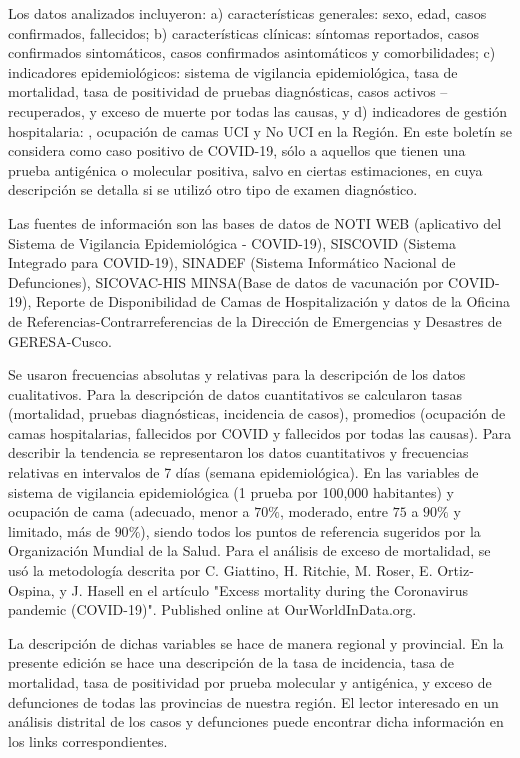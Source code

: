 \documentclass[12pt,a4paper,openany]{book}
\begin{document}
	Los datos analizados incluyeron: a) características generales: sexo, edad, casos confirmados, fallecidos; b) características clínicas: síntomas reportados, casos confirmados sintomáticos, casos confirmados asintomáticos y comorbilidades; c) indicadores epidemiológicos: sistema de vigilancia epidemiológica, tasa de mortalidad, tasa de positividad de pruebas diagnósticas, casos activos – recuperados, y exceso de muerte por todas las causas, y d) indicadores de gestión hospitalaria: , ocupación de camas UCI y No UCI en la Región. En este boletín se considera como caso positivo de COVID-19, sólo a aquellos que tienen una prueba antigénica o molecular positiva, salvo en ciertas estimaciones, en cuya descripción se detalla si se utilizó otro tipo de examen diagnóstico. 
	
	Las fuentes de información son las bases de datos de NOTI WEB (aplicativo del Sistema de Vigilancia Epidemiológica - COVID-19), SISCOVID (Sistema Integrado para COVID-19), SINADEF (Sistema Informático Nacional de Defunciones), SICOVAC-HIS MINSA(Base de datos de vacunación por COVID-19), Reporte de Disponibilidad de Camas de Hospitalización y datos de la Oficina de Referencias-Contrarreferencias de la Dirección de Emergencias y Desastres de GERESA-Cusco. 
	
	Se usaron frecuencias absolutas y relativas para la descripción de los datos cualitativos. Para la descripción de datos cuantitativos se calcularon tasas (mortalidad, pruebas diagnósticas, incidencia de casos), promedios (ocupación de camas hospitalarias, fallecidos por COVID y fallecidos por todas las causas). Para describir la tendencia se representaron los datos cuantitativos y frecuencias relativas en intervalos de 7 días (semana epidemiológica). En las variables de sistema de vigilancia epidemiológica (1 prueba por 100,000 habitantes) y ocupación de cama (adecuado, menor a $70\%$, moderado, entre $75$ a $90\%$ y limitado, más de $90\%$), siendo todos los puntos de referencia sugeridos por la Organización Mundial de la Salud. Para el análisis de exceso de mortalidad, se usó la metodología descrita por C. Giattino, H. Ritchie, M. Roser, E. Ortiz-Ospina, y J. Hasell en el artículo "Excess mortality during the Coronavirus pandemic (COVID-19)". Published online at OurWorldInData.org.
	
	La descripción de dichas variables se hace de manera regional y provincial. En la presente edición se hace una descripción de la tasa de incidencia, tasa de mortalidad, tasa de positividad por prueba molecular y antigénica, y exceso de defunciones de todas las provincias de nuestra región. El lector interesado en un análisis distrital de los casos y defunciones puede encontrar dicha información en los links correspondientes.
	
\end{document}
